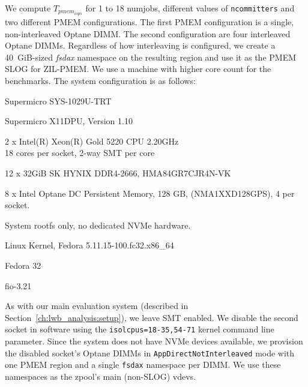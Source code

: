 \documentclass[12pt,a4paper,twoside]{book}
\begin{document}
We compute $T_{pmem_{iops}}$ for 1 to 18 numjobs, different values of \lstinline{ncommitters} and two different PMEM configurations.
The first PMEM configuration is a single, non-interleaved Optane DIMM.
The second configuration are four interleaved Optane DIMMs.
Regardless of how interleaving is configured, we create a \SI{40}{GiB}-sized \textit{fsdax} namespace on the resulting region and use it as the PMEM SLOG for ZIL-PMEM.
We use a machine with higher core count for the benchmarks.
The system configuration is as follows:
\begin{description}[noitemsep,leftmargin=1.5cm,labelindent=1cm]
    \item[System] Supermicro SYS-1029U-TRT
    \item[Mainboard] Supermicro X11DPU, Version 1.10
    \item[CPU] 2 x Intel(R) Xeon(R) Gold 5220 CPU \@ 2.20GHz \\
        18 cores per socket, 2-way SMT per core
    \item[DRAM] 12 x 32GiB SK HYNIX DDR4-2666, HMA84GR7CJR4N-VK  %
    \item[PMEM] 8 x Intel Optane DC Persistent Memory, 128 GB, (NMA1XXD128GPS), 4 per socket.
    \item[NVMe] System rootfs only, no dedicated NVMe hardware.
    \item[Kernel] Linux Kernel, Fedora 5.11.15-100.fc32.x86\_64
    \item[Userland] Fedora 32
    \item[fio] fio-3.21
\end{description}
As with our main evaluation system (described in Section~\ref{ch:lwb_analysis:setup}), we leave SMT enabled.
We disable the second socket in software using the \lstinline{isolcpus=18-35,54-71} kernel command line parameter.
Since the system does not have NVMe devices available, we provision the disabled socket's Optane DIMMs in \lstinline{AppDirectNotInterleaved} mode with one PMEM region and a single \lstinline{fsdax} namespace per DIMM.
We use these namespaces as the zpool's main (non-SLOG) vdevs.
\end{document}
